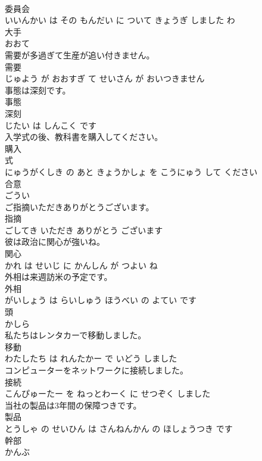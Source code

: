 \documentclass[8pt]{extreport}
\begin{document}
\begin{CJK}{UTF8}{min}
\\	委員会 
\\	いいんかい は その もんだい に ついて きょうぎ しました わ			
\\	大手	
\\	おおて			
\\	需要が多過ぎて生産が追い付きません。	
\\	需要 
\\	じゅよう が おおすぎ て せいさん が おいつきません			
\\	事態は深刻です。	
\\	事態 
\\	深刻 
\\	じたい は しんこく です			
\\	入学式の後、教科書を購入してください。	
\\	購入 
\\	式 
\\	にゅうがくしき の あと きょうかしょ を こうにゅう して ください			
\\	合意	
\\	ごうい			
\\	ご指摘いただきありがとうございます。	
\\	指摘 
\\	ごしてき いただき ありがとう ございます			
\\	彼は政治に関心が強いね。	
\\	関心 
\\	かれ は せいじ に かんしん が つよい ね			
\\	外相は来週訪米の予定です。	
\\	外相 
\\	がいしょう は らいしゅう ほうべい の よてい です			
\\	頭	
\\	かしら			
\\	私たちはレンタカーで移動しました。	
\\	移動 
\\	わたしたち は れんたかー で いどう しました			
\\	コンピューターをネットワークに接続しました。	
\\	接続 
\\	こんぴゅーたー を ねっとわーく に せつぞく しました			
\\	当社の製品は3年間の保障つきです。	
\\	製品 
\\	とうしゃ の せいひん は さんねんかん の ほしょうつき です			
\\	幹部	
\\	かんぶ			

\end{CJK}
\end{document}
